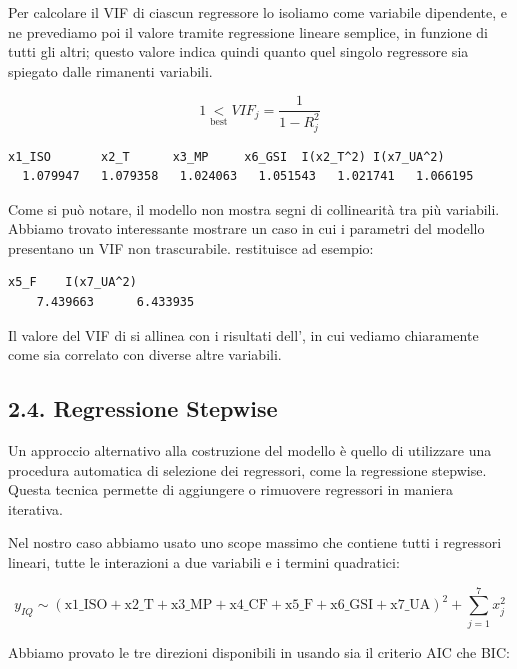 Per calcolare il VIF di ciascun regressore lo isoliamo come variabile dipendente, e ne prevediamo poi il valore tramite regressione lineare semplice, in funzione di tutti gli altri; questo valore indica quindi quanto quel singolo regressore sia spiegato dalle rimanenti variabili.

\[
1 \underset{\text{best}}< VIF_j = \frac{1}{1-R_j^2}
\]

\begin{lstlisting}[style=rconsole,caption={Multicollinearità di fit0002}]
    x1_ISO       x2_T      x3_MP     x6_GSI  I(x2_T^2) I(x7_UA^2)
  1.079947   1.079358   1.024063   1.051543   1.021741   1.066195
\end{lstlisting}

Come si può notare, il modello \texttt{} non mostra segni di collinearità tra più variabili. Abbiamo trovato interessante mostrare un caso in cui i parametri del modello presentano un VIF non trascurabile. \texttt{} restituisce ad esempio:

\begin{lstlisting}[style=rconsole,caption={Estratto dei VIF\textgreater{}5}]
        x5_F    I(x7_UA^2)
    7.439663      6.433935
\end{lstlisting}

Il valore del VIF di \texttt{} si allinea con i risultati dell'\hyperref[sec:14-analisi-di-correlazione]{}, in cui vediamo chiaramente come \texttt{} sia correlato con diverse altre variabili.

\subsection{2.4. Regressione Stepwise}
\label{sec:24-regressione-stepwise}

Un approccio alternativo alla costruzione del modello è quello di utilizzare una procedura automatica di selezione dei regressori, come la regressione stepwise. Questa tecnica permette di aggiungere o rimuovere regressori in maniera iterativa.

Nel nostro caso abbiamo usato uno scope massimo che contiene tutti i regressori lineari, tutte le interazioni a due variabili e i termini quadratici:

\[
y_{IQ} \sim (\text{x1\_ISO}+\text{x2\_T}+\text{x3\_MP}+\text{x4\_CF}+\text{x5\_F}+\text{x6\_GSI}+\text{x7\_UA})^2
+\sum_{j=1}^{7}x_j^2
\]

Abbiamo provato le tre direzioni disponibili in \texttt{} usando sia il criterio AIC che BIC:

